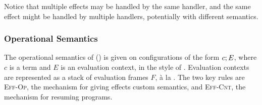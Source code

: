 Notice that multiple effects may be handled by the same handler, and the same effect might be handled by multiple handlers, potentially with different semantics. 

\subsubsection{Operational Semantics}
The operational semantics of \efflang{} () is given on configurations of the form ${c}; {E}$, where $c$ is a term and $E$ is an evaluation context, in the style of \citet{felleisen-87}. Evaluation contexts are represented as a stack of evaluation frames $F$, à la \citet{kiselyov-2012}. The two key rules are \textsc{Eff-Op}, the mechanism for giving effects custom semantics, and \textsc{Eff-Cnt}, the mechanism for resuming programs. 

